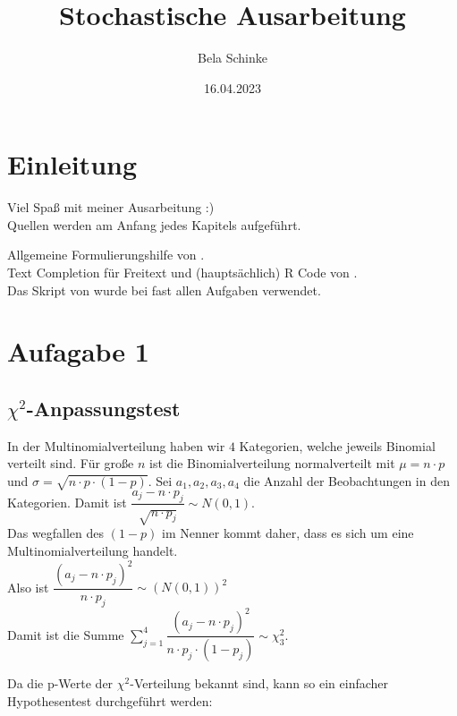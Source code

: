 \documentclass[]{article}
\title{Stochastische Ausarbeitung}
\author{Bela Schinke}
\date{16.04.2023}
\begin{document}
\maketitle

{
\setcounter{tocdepth}{2}
\tableofcontents
}
\hypertarget{einleitung}{%
\section{Einleitung}\label{einleitung}}

Viel Spaß mit meiner Ausarbeitung :)\\
Quellen werden am Anfang jedes Kapitels aufgeführt.

Allgemeine Formulierungshilfe von \citep{ChatGPT}.\\
Text Completion für Freitext und (hauptsächlich) R Code von \citep{GithubCopilot}.\\
Das Skript von \citep{skript} wurde bei fast allen Aufgaben verwendet.

\hypertarget{aufagabe-1}{%
\section{Aufagabe 1}\label{aufagabe-1}}

\hypertarget{chi2-anpassungstest}{%
\subsection{\texorpdfstring{\(\chi^2\)-Anpassungstest}{\textbackslash{}chi\^{}2-Anpassungstest}}\label{chi2-anpassungstest}}

\citep{wikipediaChi2}

In der Multinomialverteilung haben wir \(4\) Kategorien, welche jeweils Binomial verteilt sind.
Für große \(n\) ist die Binomialverteilung normalverteilt mit \(\mu = n \cdot p\) und \(\sigma = \sqrt{n \cdot p \cdot (1-p)}\).
Sei \(a_1, a_2, a_3, a_4\) die Anzahl der Beobachtungen in den Kategorien. Damit ist \(\dfrac{a_j-n \cdot p_j}{\sqrt{n \cdot p_j}}\sim N(0,1)\).\\
Das wegfallen des \((1-p)\) im Nenner kommt daher, dass es sich um eine Multinomialverteilung handelt.\\
Also ist \(\dfrac{(a_j-n \cdot p_j)^2}{n \cdot p_j}\sim (N(0,1))^2\)\\
Damit ist die Summe \(\sum_{j=1}^4 \dfrac{(a_j-n \cdot p_j)^2}{n \cdot p_j \cdot (1-p_j)}\sim \chi^2_3\).

Da die p-Werte der \(\chi^2\)-Verteilung bekannt sind, kann so ein einfacher Hypothesentest durchgeführt werden:
\end{document}
